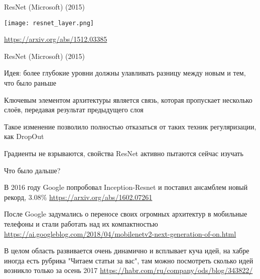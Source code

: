 \documentclass[notes,12pt, aspectratio=169]{beamer}
\newenvironment{wideitemize}{\itemize\addtolength{\itemsep}{10pt}}{\enditemize}
\begin{document}
\begin{frame}{ResNet (Microsoft) (2015)}
\begin{center}
	\texttt{[image: resnet\_layer.png]}
\end{center}
\vfill %
\footnotesize
\color{blue} \url{https://arxiv.org/abs/1512.03385}
\end{frame}



\begin{frame}{ResNet (Microsoft) (2015)}
\begin{wideitemize}
	\item \alert{Идея:} более глубокие уровни должны улавливать разницу между новым и тем, что было раньше 
	
	\item Ключевым элементом архитектуры является связь, которая пропускает несколько слоёв, передавая результат предыдущего слоя
	
	\item Такое изменение позволило полностью отказаться от таких техник регуляризации, как DropOut
	
	\item Градиенты не взрываются, свойства ResNet активно пытаются сейчас изучать
\end{wideitemize}
\end{frame}


\begin{frame}{Что было дальше?}
\begin{wideitemize}
	\item  В  2016 году Google попробовал Inception-Resnet и поставил ансамблем новый рекорд, $3.08\%$ 
	\vfill
	{\color{blue} \url{https://arxiv.org/abs/1602.07261}}
	
	\vfill
	\item После Google задумались о переносе своих огромных архитектур в мобильные телефоны и стали работать над их компактностью 
	\vfill 
	{\color{blue} \url{https://ai.googleblog.com/2018/04/mobilenetv2-next-generation-of-on.html}}
	
	\vfill 
	\item  В целом область развивается очень динамично и всплывает куча идей, на хабре иногда есть рубрика "Читаем статьи за вас", там можно посмотреть сколько идей возникло только за осень 2017
	\vfill
	{\color{blue} \url{https://habr.com/ru/company/ods/blog/343822/}}	
\end{wideitemize}
\end{frame}
\end{document}
